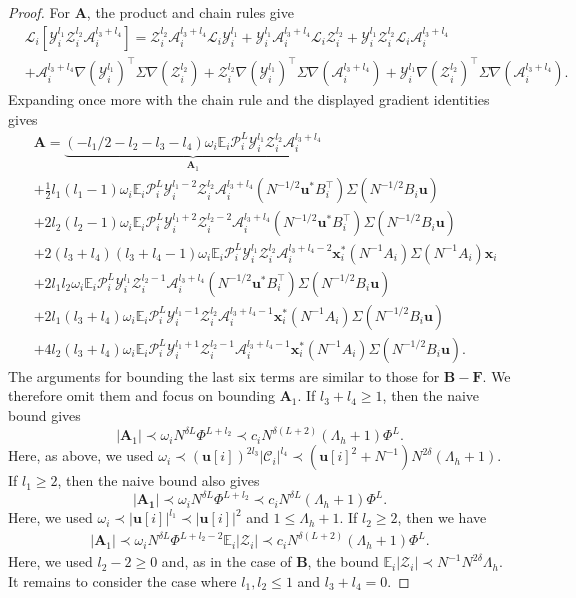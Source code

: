 \documentclass[10pt,a4paper]{amsart}
\def\E{\mathbb{E}}
\def\cA{\mathcal{A}}
\def\cC{\mathcal{C}}
\def\cL{\mathcal{L}}
\def\cP{\mathcal{P}}
\def\cY{\mathcal{Y}}
\def\cZ{\mathcal{Z}}
\def\u{\mathbf{u}}
\def\x{\mathbf{x}}
\begin{document}
\begin{proof}
For $\mathbf{A}$, the product and chain rules give
\begin{align*}
    &\cL_i[\cY_i^{l_1}\cZ_i^{l_2}\cA_i^{l_3+l_4}]=\cZ_i^{l_2}\cA_i^{l_3+l_4}\cL_i\cY_i^{l_1}+\cY_i^{l_1}\cA_i^{l_3+l_4}\cL_i\cZ_i^{l_2}+\cY_i^{l_1}\cZ_i^{l_2}\cL_i\cA_i^{l_3+l_4}\\
    &+\cA_i^{l_3+l_4}\nabla(\cY_i^{l_1})^\top\Sigma\nabla(\cZ_i^{l_2})+\cZ_i^{l_2}\nabla(\cY_i^{l_1})^\top\Sigma\nabla(\cA_i^{l_3+l_4})+\cY_i^{l_1}\nabla(\cZ_i^{l_2})^\top\Sigma\nabla(\cA_i^{l_3+l_4}).
\end{align*}
Expanding once more with the chain rule and the displayed gradient identities gives
\begin{align*}
    &\mathbf{A}=\underbrace{(-l_1/2-l_2-l_3-l_4)\omega_i\E_i\cP_i^L\cY_i^{l_1}\cZ_i^{l_2}\cA_i^{l_3+l_4}}_{\mathbf{A}_1}\\
    &+\frac12l_1(l_1-1)\omega_i\E_i\cP_i^L\cY_i^{l_1-2}\cZ_i^{l_2}\cA_i^{l_3+l_4}(N^{-1/2}\u^*B_i^\top)\Sigma(N^{-1/2}B_i\u)\\
    &+2l_2(l_2-1)\omega_i\E_i\cP_i^L\cY_i^{l_1+2}\cZ_i^{l_2-2}\cA_i^{l_3+l_4}(N^{-1/2}\u^*B_i^\top)\Sigma(N^{-1/2}B_i\u)\\
    &+2(l_3+l_4)(l_3+l_4-1)\omega_i\E_i\cP_i^L\cY_i^{l_1}\cZ_i^{l_2}\cA_i^{l_3+l_4-2}\x_i^*(N^{-1}A_i)\Sigma(N^{-1}A_i)\x_i\\
    &+2l_1l_2\omega_i\E_i\cP_i^L\cY_i^{l_1}\cZ_i^{l_2-1}\cA_i^{l_3+l_4}(N^{-1/2}\u^*B_i^\top)\Sigma(N^{-1/2}B_i\u)\\
    &+2l_1(l_3+l_4)\omega_i\E_i\cP_i^L\cY_i^{l_1-1}\cZ_i^{l_2}\cA_i^{l_3+l_4-1}\x_i^*(N^{-1}A_i)\Sigma(N^{-1/2}B_i\u)\\
    &+4l_2(l_3+l_4)\omega_i\E_i\cP_i^L\cY_i^{l_1+1}\cZ_i^{l_2-1}\cA_i^{l_3+l_4-1}\x_i^*(N^{-1}A_i)\Sigma(N^{-1/2}B_i\u).
\end{align*}
The arguments for bounding the last six terms are similar to those for $\mathbf{B}-\mathbf{F}$. We therefore omit them and focus on bounding $\mathbf{A}_1$. If $l_3+l_4\geq 1$, then the naive bound gives
\[
    |\mathbf{A}_1|\prec\omega_i N^{\delta L}\Phi^{L+l_2}\prec c_i N^{\delta (L+2)}(\Lambda_h+1)\Phi^L.
\]
Here, as above, we used $\omega_i\prec(\u[i])^{2l_3}|\cC_i|^{l_4}\prec(\u[i]^2+N^{-1})N^{2\delta}(\Lambda_h+1)$. If $l_1\geq 2$, then the naive bound also gives
\[
    |\mathbf{A_1}|\prec\omega_i N^{\delta L}\Phi^{L+l_2}\prec c_i N^{\delta L}(\Lambda_h+1)\Phi^L.
\]
Here, we used $\omega_i\prec|\u[i]|^{l_1}\prec|\u[i]|^2$ and $1\leq \Lambda_h+1$. If $l_2\geq 2$, then we have
\begin{align*}
    |\mathbf{A}_1|\prec\omega_i N^{\delta L}\Phi^{L+l_2-2}\E_i|\cZ_i|\prec c_i N^{\delta(L+2)}(\Lambda_h+1)\Phi^L.
\end{align*}
Here, we used $l_2-2\geq 0$ and, as in the case of $\mathbf{B}$, the bound $\E_i|\cZ_i|\prec N^{-1}N^{2\delta}\Lambda_h$. It remains to consider the case where $l_1,l_2\leq 1$ and $l_3+l_4=0$.


\end{proof}
\end{document}
